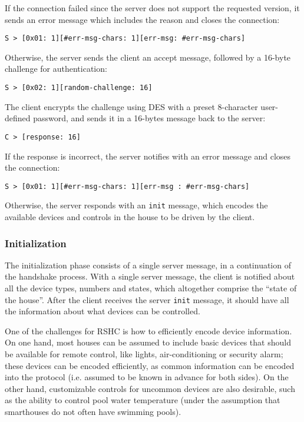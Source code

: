 \noindent
If the connection failed since the server does not support the requested version, it sends an error message which includes the reason and closes the connection:

\begin{verbatim}
S > [0x01: 1][#err-msg-chars: 1][err-msg: #err-msg-chars]
\end{verbatim}

\noindent
Otherwise, the server sends the client an accept message, followed by a 16-byte challenge for authentication:

\begin{verbatim}
S > [0x02: 1][random-challenge: 16]
\end{verbatim}

\noindent
The client encrypts the challenge using DES with a preset 8-character user-defined password, and sends it in a 16-bytes message back to the server:

\begin{verbatim}
C > [response: 16]
\end{verbatim}

\noindent
If the response is incorrect, the server notifies with an error message and closes the connection:
\begin{verbatim}
S > [0x01: 1][#err-msg-chars: 1][err-msg : #err-msg-chars]
\end{verbatim}

\noindent
Otherwise, the server responds with an {\tt init} message, which encodes the available devices and controls in the house to be driven by the client.

\subsubsection{Initialization}
\label{sec:pdus:pdu:init}

The initialization phase consists of a single server message, in a continuation of the handshake process. With a single server message, the client is notified about all the device types, numbers and states, which altogether comprise the ``state of the house''. After the client receives the server {\tt init} message, it should have all the information about what devices can be controlled.

One of the challenges for RSHC is how to efficiently encode device information. On one hand, most houses can be assumed to include basic devices that should be available for remote control, like lights, air-conditioning or security alarm; these devices can be encoded efficiently, as common information can be encoded into the protocol (i.e. assumed to be known in advance for both sides). On the other hand, customizable controls for uncommon devices are also desirable, such as the ability to control pool water temperature (under the assumption that smarthouses do not often have swimming pools).

